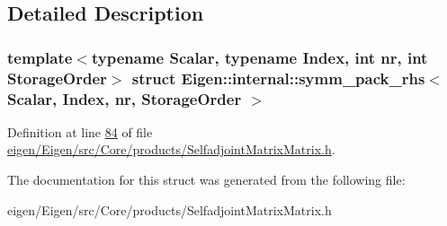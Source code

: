\subsection{Detailed Description}
\subsubsection*{template$<$typename Scalar, typename Index, int nr, int Storage\+Order$>$\newline
struct Eigen\+::internal\+::symm\+\_\+pack\+\_\+rhs$<$ Scalar, Index, nr, Storage\+Order $>$}



Definition at line \hyperlink{eigen_2_eigen_2src_2_core_2products_2_selfadjoint_matrix_matrix_8h_source_l00084}{84} of file \hyperlink{eigen_2_eigen_2src_2_core_2products_2_selfadjoint_matrix_matrix_8h_source}{eigen/\+Eigen/src/\+Core/products/\+Selfadjoint\+Matrix\+Matrix.\+h}.



The documentation for this struct was generated from the following file\+:\begin{DoxyCompactItemize}
\item 
eigen/\+Eigen/src/\+Core/products/\+Selfadjoint\+Matrix\+Matrix.\+h\end{DoxyCompactItemize}

